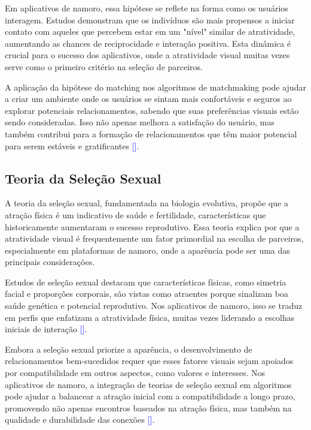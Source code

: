Em aplicativos de namoro, essa hipótese se reflete na forma como os usuários interagem. Estudos demonstram que os indivíduos são mais propensos a iniciar contato com aqueles que percebem estar em um "nível" similar de atratividade, aumentando as chances de reciprocidade e interação positiva. Esta dinâmica é crucial para o sucesso dos aplicativos, onde a atratividade visual muitas vezes serve como o primeiro critério na seleção de parceiros.

A aplicação da hipótese do matching nos algoritmos de matchmaking pode ajudar a criar um ambiente onde os usuários se sintam mais confortáveis e seguros ao explorar potenciais relacionamentos, sabendo que suas preferências visuais estão sendo consideradas. Isso não apenas melhora a satisfação do usuário, mas também contribui para a formação de relacionamentos que têm maior potencial para serem estáveis e gratificantes \textcolor{blue}{[\cite{ramaker2020impact}]}.

\subsection{Teoria da Seleção Sexual}

A teoria da seleção sexual, fundamentada na biologia evolutiva, propõe que a atração física é um indicativo de saúde e fertilidade, características que historicamente aumentaram o sucesso reprodutivo. Essa teoria explica por que a atratividade visual é frequentemente um fator primordial na escolha de parceiros, especialmente em plataformas de namoro, onde a aparência pode ser uma das principais considerações.

Estudos de seleção sexual destacam que características físicas, como simetria facial e proporções corporais, são vistas como atraentes porque sinalizam boa saúde genética e potencial reprodutivo. Nos aplicativos de namoro, isso se traduz em perfis que enfatizam a atratividade física, muitas vezes liderando a escolhas iniciais de interação \textcolor{blue}{[\cite{marcinkowska2014cross}]}.

Embora a seleção sexual priorize a aparência, o desenvolvimento de relacionamentos bem-sucedidos requer que esses fatores visuais sejam apoiados por compatibilidade em outros aspectos, como valores e interesses. Nos aplicativos de namoro, a integração de teorias de seleção sexual em algoritmos pode ajudar a balancear a atração inicial com a compatibilidade a longo prazo, promovendo não apenas encontros baseados na atração física, mas também na qualidade e durabilidade das conexões \textcolor{blue}{[\cite{thornhill2006facial}]}.

